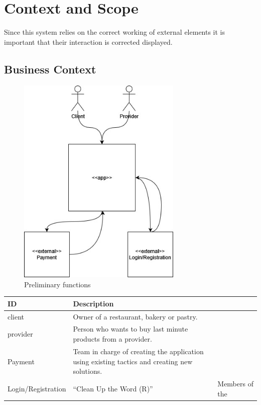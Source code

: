 \section{Context and Scope}

Since this system relies on the correct working of external elements it is important that their interaction is 
corrected displayed.

\subsection{Business Context}

\begin{figure}[H]
    \centering
    \includegraphics[width=0.7\textwidth]{assets/business_context.jpg}
    \caption{Preliminary functions}
    \label{fig:preliminary_use_case}
\end{figure}

\begin{table}[H]
    \begin{tabularx}{\textwidth}{lX}
    \toprule
    ID & Description   \\
    \midrule
    \gls{client} & Owner of a restaurant, bakery or pastry. \\
    \gls{provider} & Person who wants to buy last minute products from a provider. \\
    Payment & Team in charge of creating the application using existing tactics and creating new solutions. \\
    Login/Registration & ``Clean Up the Word (R)'' & Members of the  \\
    \bottomrule
    \end{tabularx}
\end{table}

